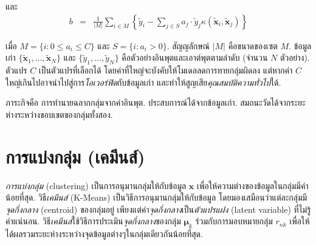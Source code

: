และ
\begin{eqnarray}
b &=& \frac{1}{|M|}  \sum_{i \in M} 
\left\{ \tilde{y}_i - \sum_{j \in S} a_j \cdot \tilde{y}_j \kappa(\bm{\tilde{x}}_i, \bm{\tilde{x}}_j) \right\}
\label{eq: opt SVM b}
\end{eqnarray}

เมื่อ $M = \{i: 0 \leq a_i \leq C \}$
และ
$S = \{i: a_i > 0\}$.
สัญญลักษณ์ $|M|$ คือขนาดของเซต $M$.
ข้อมูลเก่า $\{\bm{\tilde{x}}_1, \ldots, \bm{\tilde{x}}_N\}$ และ $\{\tilde{y}_1, \ldots, \tilde{y}_N\}$ คือตัวอย่างอินพุตและเอาต์พุตตามลำดับ (จำนวน $N$ ตัวอย่าง).
ตัวแปร $C$ เป็นตัวแปรที่เลือกได้ โดยค่าที่ใหญ่จะบังคับให้โมเดลลดการทายกลุ่มผิดลง
แต่หากค่า $C$ ใหญ่เกินไปอาจนำไปสู่การ\textit{โอเวอร์ฟิต}กับข้อมูลเก่า และทำให้สูญเสีย\textit{คุณสมบัติความทั่วไป}ได้.

ภาระกิจคือ การทำนายฉลากกลุ่มจากค่าอินพุต.
ประสบการณ์ได้จากข้อมูลเก่า.
สมถนะวัดได้จากระยะห่างระหว่างขอบเขตของกลุ่มทั้งสอง.

%
%


%

\section{การแบ่งกลุ่ม (เคมีนส์)}

\textit{การแบ่งกลุ่ม} (clustering)
เป็นการอนุมานกลุ่มให้กับข้อมูล $\bm{x}$
เพื่อให้ความต่างของข้อมูลในกลุ่มมีค่าน้อยที่สุด.
%
วิธี\textit{เคมีนส์} (K-Means) เป็นวิธีการอนุมานกลุ่มให้กับข้อมูล
โดยมองเสมือนว่าแต่ละกลุ่มมี\textit{จุดกึ่งกลาง} (centroid) ของกลุ่มอยู่ เพียงแต่ค่า\textit{จุดกึ่งกลาง}เป็น\textit{ตัวแปรแฝง} (latent variable) ที่ไม่รู้ค่าแน่นอน.
วิธี\textit{เคมีนส์}ใช้วิธีการประเมิน\textit{จุดกึ่งกลาง}ของกลุ่ม $\bm{\mu}_k$
ร่วมกับการมอบหมายกลุ่ม $r_{nk}$
เพื่อให้ได้ผลรวมระยะห่างระหว่างจุดข้อมูลต่างๆในกลุ่มเดียวกันน้อยที่สุด.
%

